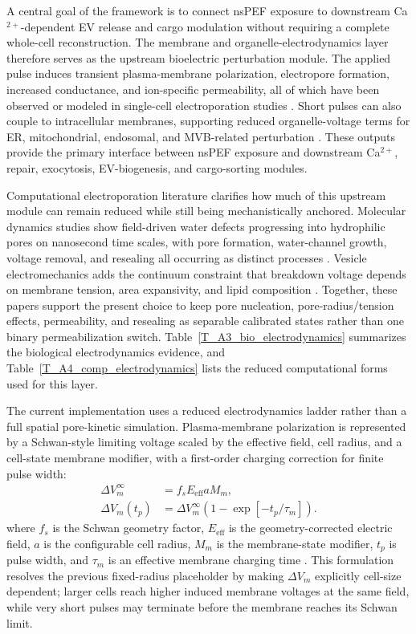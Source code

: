 \documentclass[Afour,sagev,times]{sagej}
\begin{document}
A central goal of the framework is to connect nsPEF exposure to downstream Ca$^{2+}$-dependent EV release and cargo modulation without requiring a complete whole-cell reconstruction. The membrane and organelle-electrodynamics layer therefore serves as the upstream bioelectric perturbation module. The applied pulse induces transient plasma-membrane polarization, electropore formation, increased conductance, and ion-specific permeability, all of which have been observed or modeled in single-cell electroporation studies \cite{kotnik2000analytical,krassowska2007modeling,pakhomov2007long}. Short pulses can also couple to intracellular membranes, supporting reduced organelle-voltage terms for ER, mitochondrial, endosomal, and MVB-related perturbation \cite{vernier2003calcium,semenov2013primary,beebe2012transient,baker2024numerical}. These outputs provide the primary interface between nsPEF exposure and downstream Ca$^{2+}$, repair, exocytosis, EV-biogenesis, and cargo-sorting modules.

Computational electroporation literature clarifies how much of this upstream module can remain reduced while still being mechanistically anchored. Molecular dynamics studies show field-driven water defects progressing into hydrophilic pores on nanosecond time scales, with pore formation, water-channel growth, voltage removal, and resealing all occurring as distinct processes \cite{tieleman2004molecular,tarek2005membrane}. Vesicle electromechanics adds the continuum constraint that breakdown voltage depends on membrane tension, area expansivity, and lipid composition \cite{needham1989electro}. Together, these papers support the present choice to keep pore nucleation, pore-radius/tension effects, permeability, and resealing as separable calibrated states rather than one binary permeabilization switch. Table~\ref{T_A3_bio_electrodynamics} summarizes the biological electrodynamics evidence, and Table~\ref{T_A4_comp_electrodynamics} lists the reduced computational forms used for this layer.

The current implementation uses a reduced electrodynamics ladder rather than a full spatial pore-kinetic simulation. Plasma-membrane polarization is represented by a Schwan-style limiting voltage scaled by the effective field, cell radius, and a cell-state membrane modifier, with a first-order charging correction for finite pulse width:
\[
\begin{aligned}
\Delta V_m^{\infty} &= f_sE_{\mathrm{eff}}aM_m, \\
\Delta V_m(t_p) &= \Delta V_m^{\infty}
\left(1-\exp[-t_p/\tau_m]\right).
\end{aligned}
\]
where $f_s$ is the Schwan geometry factor, $E_{\mathrm{eff}}$ is the geometry-corrected electric field, $a$ is the configurable cell radius, $M_m$ is the membrane-state modifier, $t_p$ is pulse width, and $\tau_m$ is an effective membrane charging time \cite{kotnik2000analytical,joshi2000electroporation,kotnik2019membrane}. This formulation resolves the previous fixed-radius placeholder by making $\Delta V_m$ explicitly cell-size dependent; larger cells reach higher induced membrane voltages at the same field, while very short pulses may terminate before the membrane reaches its Schwan limit.
\end{document}
